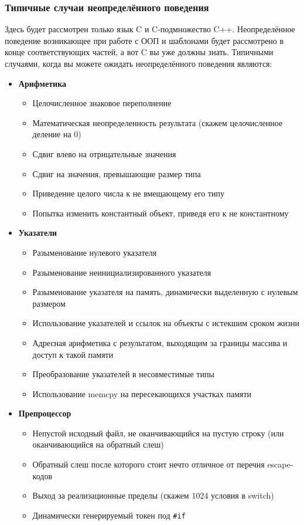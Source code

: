 \documentclass[a4paper,12pt,oneside]{article}
\begin{document}
\subsubsection{Типичные случаи неопределённого поведения}\label{TypicalUB}

Здесь будет рассмотрен только язык C и C-подмножество C++. Неопределённое поведение возникающее при работе с ООП и шаблонами будет рассмотрено в конце соответствующих частей, а вот C вы уже должны знать. Типичными случаями, когда вы можете ожидать неопределённого поведения являются:

\begin {itemize}
\item \textbf {Арифметика}
\begin {itemize}
\item Целочисленное знаковое переполнение
\item Математическая неопределенность результата (скажем целочисленное деление на 0)
\item Сдвиг влево на отрицательные значения
\item Сдвиг на значения, превышающие размер типа
\item Приведение целого числа к не вмещающему его типу
\item Попытка изменить константный объект, приведя его к не константному
\end {itemize}
\item \textbf {Указатели}
\begin {itemize}
\item Разыменование нулевого указателя
\item Разыменование неинициализированного указателя
\item Разыменование указателя на память, динамически выделенную с нулевым размером
\item Использование указателей и ссылок на объекты с истекшим сроком жизни
\item Адресная арифметика с результатом, выходящим за границы массива и доступ к такой памяти
\item Преобразование указателей в несовместимые типы
\item Использование memcpy на пересекающихся участках памяти
\end {itemize}
\item \textbf {Препроцессор}
\begin {itemize}
\item Непустой исходный файл, не оканчивающийся на пустую строку (или оканчивающийся на обратный слеш)
\item Обратный слеш после которого стоит нечто отличное от перечня escape-кодов
\item Выход за реализационные пределы (скажем 1024 условия в switch)
\item Динамически генерируемый токен под \lstinline!#if!
\end {itemize}
\end {itemize}
\end{document}
